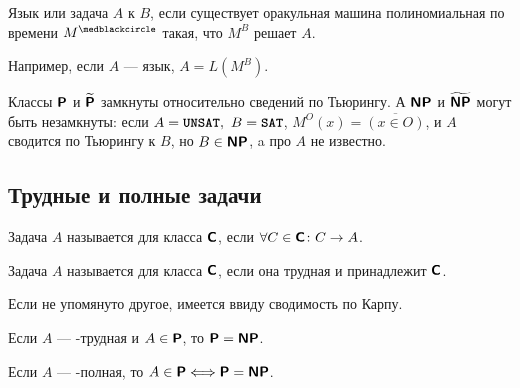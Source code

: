 \begin{defn}
	Язык или задача $ A$  к $ B$, если существует оракульная машина полиномиальная по времени $ M^{\medblackcircle}$ такая, что $ M^{B}$ решает $ A$.

	\noindent
	Например, если  $ A$ ---  язык, $ A = L(M^{B})$.
\end{defn}
\begin{ex}
	Классы $\P$ и $\tP$ замкнуты относительно сведений по Тьюрингу. А $\NP$ и $\tNP$ могут быть незамкнуты: если $A = \UNSAT,~ B = \SAT$, $ M^{O}(x) = \overline{(x \in O)}$, и $ A$ сводится по Тьюрингу к $ B$, но $ B \in \NP$, a про $ A$ не известно.
\end{ex}

\subsection{Трудные и полные задачи}
\begin{defn}
	Задача $ A$ называется  для класса $\Class$, если  $ \forall C \in \Class \colon C \to A$.

	\noindent
	Задача $ A$ называется  для класса $ \Class$, если она трудная и принадлежит $ \Class$.
\end{defn}
\begin{note}
    Если не упомянуто другое, имеется ввиду сводимость по Карпу.
\end{note}

\begin{thm}
    Если $ A$ --- \NP-трудная и $ A \in \P$, то $ \P = \NP$.
\end{thm}

\begin{cor}
    Если $ A$ --- \NP-полная, то $
    A \in \P \Longleftrightarrow \P = \NP
    $. 
\end{cor}


